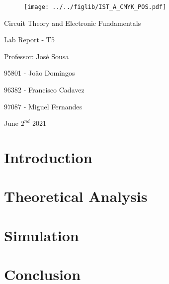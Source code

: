 \documentclass[11pt]{article}
\begin{document}
\thispagestyle{empty}
\begin{figure}[h]
	\centering
	\texttt{[image: ../../figlib/IST\_A\_CMYK\_POS.pdf]}
\end{figure}

\begin{center}
	\huge{Circuit Theory and Electronic Fundamentals}
	
	\huge{Lab Report - T5}
	
	\vspace{30pt}
	
	\large{Professor: José Sousa}
	
	\vspace{20pt}
	
	\large{95801 - João Domingos}
	
	\large{96382 - Francisco Cadavez}
	
	\large{97087 - Miguel Fernandes}
	
	\vspace{20pt}
	
	\large{June $2^{nd}$ 2021}
\end{center}

\pagebreak
\tableofcontents

\pagebreak
\section{Introduction}


\pagebreak
\section{Theoretical Analysis}
\label{sec:theory}


\clearpage
\section{Simulation}


\pagebreak
\section{Conclusion}
\label{sec:conc}

\end{document}
